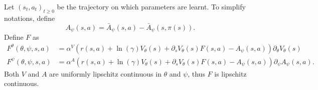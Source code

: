 Let $(s_t, a_t)_{t\geq 0}$ be the trajectory on which parameters are
learnt. To simplify notations, define
\begin{equation}
	A_\psi(s, a) = \bar{A}_\psi(s, a) - \bar{A}_\psi(s, \pi(s)).
\end{equation}
Define $F$ as
\begin{align}
	F^\theta(\theta, \psi, s, a) &= \alpha^V (r(s, a) + \ln(\gamma) V_\theta(s) + \partial_s V_\theta(s) F(s, a) - A_\psi(s, a))\partial_\theta V_\theta(s)\\
	F^\psi(\theta, \psi, s, a) &= \alpha^A (r(s, a) + \ln(\gamma) V_\theta(s) + \partial_s V_\theta(s) F(s, a) - A_\psi(s, a))\partial_\psi A_\psi(s, a).
\end{align}
Both $V$ and $A$ are uniformly lipschitz continuous in $\theta$ and $\psi$, thus
$F$ is lipschitz continuous.

